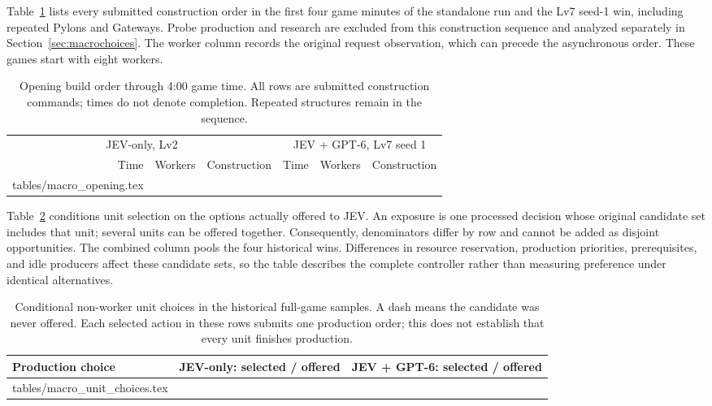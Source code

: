\documentclass{article}
\makeatletter
\newcommand{\tablerows}[1]{\@@input #1 }
\newcommand{\captionbelowtable}{\normalsize\setlength{\abovecaptionskip}{7pt}\setlength{\belowcaptionskip}{0pt}}
\makeatother
\begin{document}
Table~\ref{tab:opening} lists every submitted construction order in the first four game minutes of the standalone run and the Lv7 seed-1 win, including repeated Pylons and Gateways. Probe production and research are excluded from this construction sequence and analyzed separately in Section~\ref{sec:macrochoices}. The worker column records the original request observation, which can precede the asynchronous order. These games start with eight workers.

\begin{table}[H]
\centering\small
\setlength{\tabcolsep}{5pt}
\begin{tabular}{rrlrrl}
\toprule
\multicolumn{3}{c}{JEV-only, Lv2} & \multicolumn{3}{c}{JEV + GPT-6, Lv7 seed 1} \\
\cmidrule(lr){1-3}\cmidrule(lr){4-6}
Time & Workers & Construction & Time & Workers & Construction \\
\midrule
\tablerows{tables/macro_opening.tex}
\bottomrule
\end{tabular}
\captionbelowtable
\caption{Opening build order through 4:00 game time. All rows are submitted construction commands; times do not denote completion. Repeated structures remain in the sequence.}
\label{tab:opening}
\end{table}

Table~\ref{tab:unitchoices} conditions unit selection on the options actually offered to JEV. An exposure is one processed decision whose original candidate set includes that unit; several units can be offered together. Consequently, denominators differ by row and cannot be added as disjoint opportunities. The combined column pools the four historical wins. Differences in resource reservation, production priorities, prerequisites, and idle producers affect these candidate sets, so the table describes the complete controller rather than measuring preference under identical alternatives.

\begin{table}[H]
\centering\small
\begin{tabular}{lrr}
\toprule
Production choice & JEV-only: selected / offered & JEV + GPT-6: selected / offered \\
\midrule
\tablerows{tables/macro_unit_choices.tex}
\bottomrule
\end{tabular}
\captionbelowtable
\caption{Conditional non-worker unit choices in the historical full-game samples. A dash means the candidate was never offered. Each selected action in these rows submits one production order; this does not establish that every unit finishes production.}
\label{tab:unitchoices}
\end{table}
\end{document}
